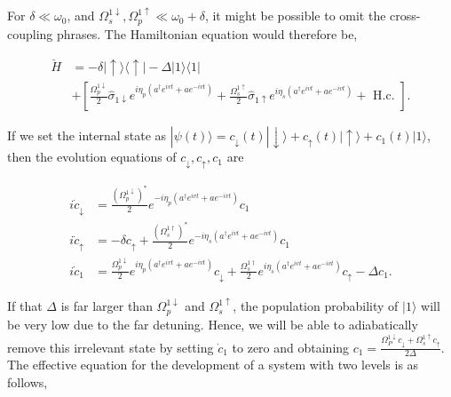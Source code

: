 For $\delta\ll\omega_0$, and $\Omega_s^{1\downarrow},\Omega_p^{1\uparrow} \ll \omega_0+\delta$, it might be possible to omit the cross-coupling phrases. The Hamiltonian equation would therefore be,

\begin{equation}
    \begin{aligned}
        \breve{H} & =-\delta|\uparrow\rangle\langle\uparrow|-\Delta| 1\rangle\langle 1|                                                                                                                                                                                                            \\
                  & +\left[\frac{\Omega_p^{1 \downarrow}}{2} \hat{\sigma}_{1 \downarrow} e^{i \eta_p\left(a^{\dagger} e^{i v t}+a e^{-i v t}\right)}+\frac{\Omega_s^{1 \uparrow}}{2} \hat{\sigma}_{1 \uparrow} e^{i \eta_s\left(a^{\dagger} e^{i v t}+a e^{-i v t}\right)}+\text { H.c. }\right] .
    \end{aligned}
\end{equation}

If we set the internal state as $|\psi(t)\rangle=c_{\downarrow}(t)|\downarrow\rangle+c_{\uparrow}(t)|\uparrow\rangle+c_1(t)|1\rangle$, then the evolution equations of $c_{\downarrow},c_{\uparrow},c_1$ are

\begin{equation}
    \begin{aligned}
        i \dot{c}_{\downarrow} & =\frac{\left(\Omega_p^{1 \downarrow}\right)^*}{2} e^{-i \eta_p\left(a^{\dagger} e^{i v t}+a e^{-i v t}\right)} c_1                                                                                                                 \\
        i \dot{c}_{\uparrow}   & =-\delta c_{\uparrow}+\frac{\left(\Omega_s^{1 \dagger}\right)^*}{2} e^{-i \eta_s\left(a^{\dagger} e^{i v t}+a e^{-i v t}\right)} c_1                                                                                               \\
        i \dot{c}_1            & =\frac{\Omega_p^{1 \downarrow}}{2} e^{i \eta_p\left(a^{\dagger} e^{i v t}+a e^{-i v t}\right)} c_{\downarrow}+\frac{\Omega_s^{1 \dagger}}{2} e^{i \eta_s\left(a^{\dagger} e^{i v t}+a e^{-i v t}\right)} c_{\uparrow}-\Delta c_1 .
    \end{aligned}
\end{equation}

If that $\Delta$ is far larger than $\Omega^{1\downarrow}_p$ and $\Omega^{1\uparrow}_s$, the population probability of $|1\rangle$ will be very low due to the far detuning. Hence, we will be able to adiabatically remove this irrelevant state by setting $\dot{c}_1$ to zero and obtaining  $c_1=\frac{\Omega^{1\downarrow}_P c_{\downarrow}+\Omega^{1\uparrow}_s c_{\uparrow}}{2\Delta}$. The effective equation for the development of a system with two levels is as follows,

